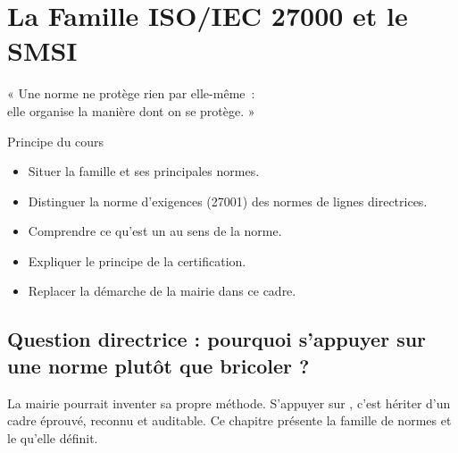 
\chapter{La Famille ISO/IEC 27000 et le SMSI}
\label{chap:iso27000}

\epigraph{%
    « Une norme ne protège rien par elle-même~:\\
    elle organise la manière dont on se protège. »%
}{Principe du cours}


\begin{boxobjectifs}
\begin{itemize}
    \item Situer la famille  et ses principales normes.
    \item Distinguer la norme d'exigences (27001) des normes de lignes
          directrices.
    \item Comprendre ce qu'est un  au sens de la norme.
    \item Expliquer le principe de la certification.
    \item Replacer la démarche de la mairie dans ce cadre.
\end{itemize}
\end{boxobjectifs}

\bigskip

\section*{Question directrice : pourquoi s'appuyer sur une norme plutôt que bricoler ?}

La mairie pourrait inventer sa propre méthode. S'appuyer sur
, c'est hériter d'un cadre éprouvé, reconnu et auditable.
Ce chapitre présente la famille de normes et le  qu'elle définit.

